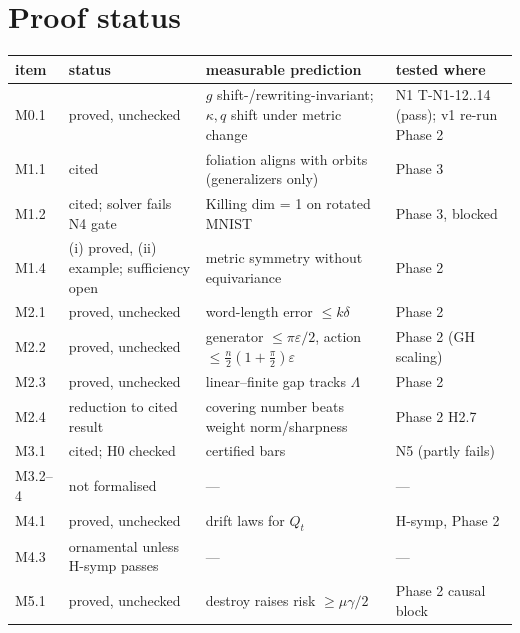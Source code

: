 \documentclass[11pt]{article}
\theoremstyle{remark}\newtheorem{rem}{Remark}
\begin{document}
\section*{Proof status}
\begin{center}\small\begin{tabular}{@{}p{1.1cm}p{4.2cm}p{5.6cm}p{3.3cm}@{}}\toprule
item & status & measurable prediction & tested where\\\midrule
M0.1 & proved, unchecked & $g$ shift-/rewriting-invariant; $\kappa,q$ shift under metric change & N1 T-N1-12..14 (pass); v1 re-run Phase 2\\
M1.1 & cited & foliation aligns with orbits (generalizers only) & Phase 3\\
M1.2 & cited; solver fails N4 gate & Killing dim = 1 on rotated MNIST & Phase 3, blocked\\
M1.4 & (i) proved, (ii) example; sufficiency open & metric symmetry without equivariance & Phase 2\\
M2.1 & proved, unchecked & word-length error $\le k\delta$ & Phase 2\\
M2.2 & proved, unchecked & generator $\le\pi\varepsilon/2$, action $\le\tfrac n2(1+\tfrac\pi2)\varepsilon$ & Phase 2 (GH scaling)\\
M2.3 & proved, unchecked & linear--finite gap tracks $\Lambda$ & Phase 2\\
M2.4 & reduction to cited result & covering number beats weight norm/sharpness & Phase 2 H2.7\\
M3.1 & cited; H0 checked & certified bars & N5 (partly fails)\\
M3.2--4 & not formalised & --- & ---\\
M4.1 & proved, unchecked & drift laws for $Q_t$ & H-symp, Phase 2\\
M4.3 & ornamental unless H-symp passes & --- & ---\\
M5.1 & proved, unchecked & destroy raises risk $\ge\mu\gamma/2$ & Phase 2 causal block\\
\bottomrule\end{tabular}\end{center}
\end{document}
